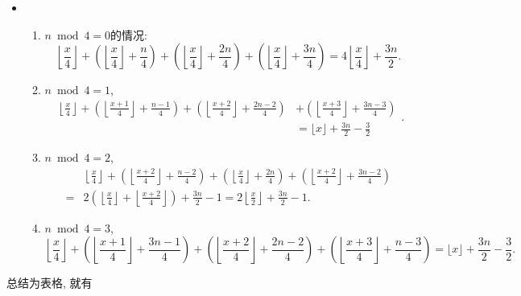 \documentclass{ctexart}
\begin{document}
\begin{itemize}
\item \begin{enumerate}
    \item $n \bmod 4=0$的情况: $$\left\lfloor\frac{x}{4}\right\rfloor+\left(\left\lfloor\frac{x}{4}\right\rfloor+\frac{n}{4}\right)+\left(\left\lfloor\frac{x}{4}\right\rfloor+\frac{2 n}{4}\right)+\left(\left\lfloor\frac{x}{4}\right\rfloor+\frac{3 n}{4}\right)=4\left\lfloor\frac{x}{4}\right\rfloor+\frac{3 n}{2}.$$
    \item $n \bmod 4=1$, $$\begin{aligned}\left\lfloor\frac{x}{4}\right\rfloor+\left(\left\lfloor\frac{x+1}{4}\right\rfloor+\frac{n-1}{4}\right)+\left(\left\lfloor\frac{x+2}{4}\right\rfloor+\frac{2 n-2}{4}\right) & +\left(\left\lfloor\frac{x+3}{4}\right\rfloor+\frac{3 n-3}{4}\right) \\ & =\lfloor x\rfloor+\frac{3 n}{2}-\frac{3}{2}\end{aligned}.$$
    \item $n \bmod 4=2$, $$\begin{aligned} & \left\lfloor\frac{x}{4}\right\rfloor+\left(\left\lfloor\frac{x+2}{4}\right\rfloor+\frac{n-2}{4}\right)+\left(\left\lfloor\frac{x}{4}\right\rfloor+\frac{2 n}{4}\right)+\left(\left\lfloor\frac{x+2}{4}\right\rfloor+\frac{3 n-2}{4}\right) \\ = & 2\left(\left\lfloor\frac{x}{4}\right\rfloor+\left\lfloor\frac{x+2}{4}\right\rfloor\right)+\frac{3 n}{2}-1=2\left\lfloor\frac{x}{2}\right\rfloor+\frac{3 n}{2}-1 .\end{aligned}$$
    \item $n \bmod 4=3$, $$\left\lfloor\frac{x}{4}\right\rfloor+\left(\left\lfloor\frac{x+1}{4}\right\rfloor+\frac{3 n-1}{4}\right)+\left(\left\lfloor\frac{x+2}{4}\right\rfloor+\frac{2 n-2}{4}\right)+\left(\left\lfloor\frac{x+3}{4}\right\rfloor+\frac{n-3}{4}\right)=\lfloor x \rfloor+\frac{3 n}{2}-\frac{3}{2}.$$
\end{enumerate}
\end{itemize}

总结为表格, 就有
\end{document}
